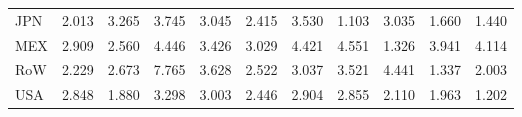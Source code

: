 \begin{table}[htbp]
\begin{tabular}{lcccccccccc}
  JPN & \textcolor[RGB]{212,137,43}{2.013} & \textcolor[RGB]{125,81,130}{3.265} & \textcolor[RGB]{87,56,168}{3.745} & \textcolor[RGB]{130,84,125}{3.045} & \textcolor[RGB]{191,124,64}{2.415} & \textcolor[RGB]{102,66,153}{3.530} & \textcolor[RGB]{250,162,5}{1.103} & \textcolor[RGB]{135,87,120}{3.035} & \textcolor[RGB]{224,145,31}{1.660} & \textcolor[RGB]{230,148,26}{1.440} \\ 
  MEX & \textcolor[RGB]{150,97,105}{2.909} & \textcolor[RGB]{181,117,74}{2.560} & \textcolor[RGB]{59,38,196}{4.446} & \textcolor[RGB]{115,74,140}{3.426} & \textcolor[RGB]{138,89,117}{3.029} & \textcolor[RGB]{64,41,191}{4.421} & \textcolor[RGB]{56,36,199}{4.551} & \textcolor[RGB]{240,155,15}{1.326} & \textcolor[RGB]{77,50,178}{3.941} & \textcolor[RGB]{69,45,186}{4.114} \\ 
  RoW & \textcolor[RGB]{204,132,51}{2.229} & \textcolor[RGB]{171,111,84}{2.673} & \textcolor[RGB]{18,12,237}{7.765} & \textcolor[RGB]{94,61,161}{3.628} & \textcolor[RGB]{186,120,69}{2.522} & \textcolor[RGB]{133,86,122}{3.037} & \textcolor[RGB]{105,68,150}{3.521} & \textcolor[RGB]{61,40,194}{4.441} & \textcolor[RGB]{235,152,20}{1.337} & \textcolor[RGB]{214,139,41}{2.003} \\ 
  USA & \textcolor[RGB]{158,102,97}{2.848} & \textcolor[RGB]{222,144,33}{1.880} & \textcolor[RGB]{122,79,133}{3.298} & \textcolor[RGB]{140,91,115}{3.003} & \textcolor[RGB]{189,122,66}{2.446} & \textcolor[RGB]{153,99,102}{2.904} & \textcolor[RGB]{156,101,99}{2.855} & \textcolor[RGB]{207,134,48}{2.110} & \textcolor[RGB]{217,140,38}{1.963} & \textcolor[RGB]{247,160,8}{1.202} \\ 
   \hline
\end{tabular}
\end{table}
